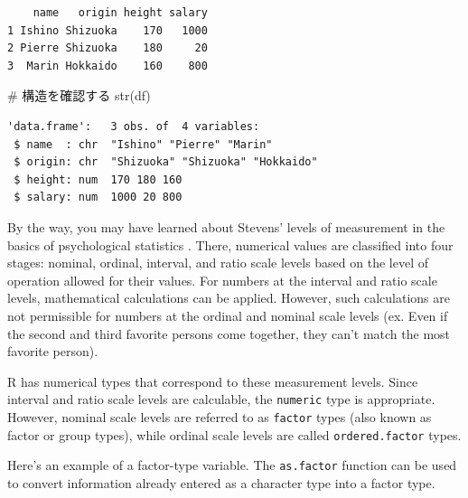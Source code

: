 \documentclass[
  a4paper,
]{book}
\newenvironment{Shaded}{\begin{snugshade}}{\end{snugshade}}
\newcommand{\CommentTok}[1]{\textcolor[rgb]{0.37,0.37,0.37}{#1}}
\newcommand{\FunctionTok}[1]{\textcolor[rgb]{0.28,0.35,0.67}{#1}}
\newcommand{\NormalTok}[1]{\textcolor[rgb]{0.00,0.23,0.31}{#1}}
\newcommand{\OtherTok}[1]{\textcolor[rgb]{0.00,0.23,0.31}{#1}}
\newcommand{\SpecialCharTok}[1]{\textcolor[rgb]{0.37,0.37,0.37}{#1}}
\begin{document}
\begin{verbatim}
    name   origin height salary
1 Ishino Shizuoka    170   1000
2 Pierre Shizuoka    180     20
3  Marin Hokkaido    160    800
\end{verbatim}

\begin{Shaded}
\begin{Highlighting}[]
\CommentTok{\# 構造を確認する}
\FunctionTok{str}\NormalTok{(df)}
\end{Highlighting}
\end{Shaded}

\begin{verbatim}
'data.frame':   3 obs. of  4 variables:
 $ name  : chr  "Ishino" "Pierre" "Marin"
 $ origin: chr  "Shizuoka" "Shizuoka" "Hokkaido"
 $ height: num  170 180 160
 $ salary: num  1000 20 800
\end{verbatim}

By the way, you may have learned about Stevens' levels of measurement in
the basics of psychological statistics \autocite{stevens1946}. There,
numerical values are classified into four stages: nominal, ordinal,
interval, and ratio scale levels based on the level of operation allowed
for their values. For numbers at the interval and ratio scale levels,
mathematical calculations can be applied. However, such calculations are
not permissible for numbers at the ordinal and nominal scale levels (ex.
Even if the second and third favorite persons come together, they can't
match the most favorite person).

R has numerical types that correspond to these measurement levels. Since
interval and ratio scale levels are calculable, the \texttt{numeric}
type is appropriate. However, nominal scale levels are referred to as
\texttt{factor} types (also known as factor or group types), while
ordinal scale levels are called \texttt{ordered.factor} types.

Here's an example of a factor-type variable. The \texttt{as.factor}
function can be used to convert information already entered as a
character type into a factor type.

\begin{Shaded}
\end{Shaded}
\end{document}
